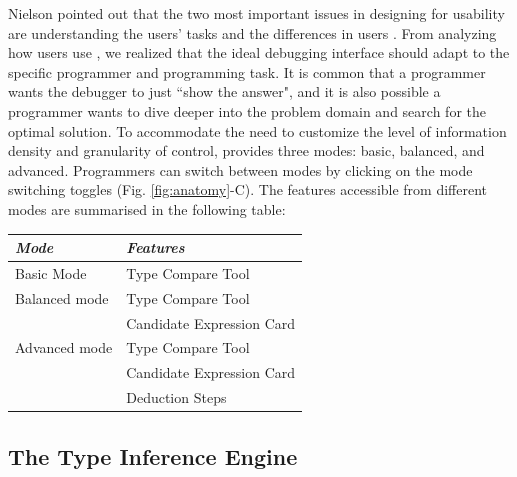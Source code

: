 Nielson pointed out  that the two most important issues in designing for usability are understanding the users' tasks and the differences in users \cite{jakob_nielsen_usability_1993}. From analyzing how users use \chameleon{}, we realized that the ideal debugging interface should adapt to the specific programmer and programming task. It is common that a programmer wants the debugger to just ``show the answer", and it is also possible a programmer wants to dive deeper into the problem domain and search for the optimal solution. To accommodate the need to customize the level of information density and granularity of control, \chameleon{} provides three modes: basic, balanced, and advanced. Programmers can switch between modes by clicking on the mode switching toggles (Fig. \ref{fig:anatomy}-C). The features accessible from different modes are summarised in the following table:%

\begin{scriptsize}
\begin{center}
    \begin{tabular}{ l l  }
     \textit{Mode} & \textit{Features} \\ \hline
     Basic Mode & Type Compare Tool \\ \hline
     Balanced mode & Type Compare Tool \\
     & Candidate Expression Card \\  \hline
     Advanced mode & Type Compare Tool \\
     & Candidate Expression Card \\
     & Deduction Steps \\
    \end{tabular}
    \end{center}
\end{scriptsize}


\subsection{The Type Inference Engine}
\label{sec:typeinferenceengine}

